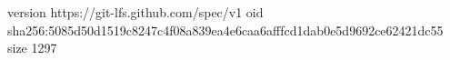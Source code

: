 version https://git-lfs.github.com/spec/v1
oid sha256:5085d50d1519c8247c4f08a839ea4e6caa6afffcd1dab0e5d9692ce62421dc55
size 1297
